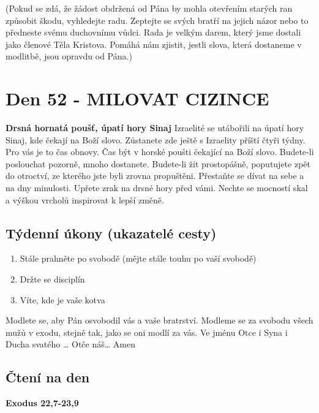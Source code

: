 \documentclass[11pt]{article}
\newcommand{\zacatekOsmyTyden}{
  \textbf{Drsná hornatá poušť, úpatí hory Sinaj} \newline 
  Izraelité se utábořili na úpatí hory Sinaj, kde čekají na Boží slovo. Zůstanete zde ještě s Izraelity příští čtyři týdny. Pro vás je to čas obnovy. Čas být v horské poušti čekající na Boží slovo. Budete-li poslouchat pozorně, mnoho dostanete. Budete-li žít prostopášně, poputujete zpět do otroctví, ze kterého jste byli zrovna propuštěni. Přestaňte se dívat na sebe a na dny minulosti. Upřete zrak na drsné hory před vámi. Nechte se mocností skal a výškou vrcholů inspirovat k lepší změně.
  \subsection*{Týdenní úkony (ukazatelé cesty)}
\begin{enumerate}
  \item Stále prahněte po svobodě (mějte stále touhu po vaší svobodě)
  \item Držte se disciplín
  \item Víte, kde je vaše kotva
\end{enumerate}
Modlete se, aby Pán osvobodil vás a vaše bratrství. \newline
Modleme se za svobodu všech mužů v exodu, stejně tak, jako se oni modlí za vás.\newline
Ve jménu Otce i Syna i Ducha svatého …  Otče náš… Amen
}
\begin{document}
(Pokud se zdá, že žádost obdržená od Pána by mohla otevřením starých ran způsobit škodu, vyhledejte radu. Zeptejte
se svých bratří na jejich názor nebo to předneste svému duchovnímu vůdci. Rada je velkým darem, který jsme dostali
jako členové Těla Kristova. Pomáhá nám zjistit, jestli slova, která dostaneme v modlitbě, jsou opravdu od Pána.)

\newpage
\section{Den 52 - MILOVAT CIZINCE }
\zacatekOsmyTyden
\subsection*{Čtení na den}
\textbf{Exodus 22,7-23,9}
\newline
\end{document}
